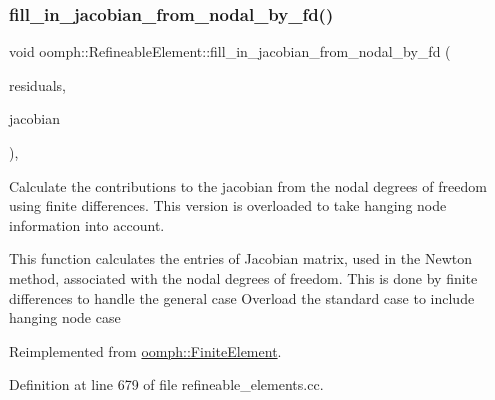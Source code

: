 \mbox{\label{classoomph_1_1RefineableElement_a83ff8606d2ccf11f7c70a95991cd50d5}} 
\subsubsection{\texorpdfstring{fill\+\_\+in\+\_\+jacobian\+\_\+from\+\_\+nodal\+\_\+by\+\_\+fd()}{fill\_in\_jacobian\_from\_nodal\_by\_fd()}}
{\footnotesize\ttfamily void oomph\+::\+Refineable\+Element\+::fill\+\_\+in\+\_\+jacobian\+\_\+from\+\_\+nodal\+\_\+by\+\_\+fd (\begin{DoxyParamCaption}\item[{\hyperlink{classoomph_1_1Vector}{Vector}$<$ double $>$ \&}]{residuals,  }\item[{\hyperlink{classoomph_1_1DenseMatrix}{Dense\+Matrix}$<$ double $>$ \&}]{jacobian }\end{DoxyParamCaption})\hspace{0.3cm}{\ttfamily [protected]}, {\ttfamily [virtual]}}



Calculate the contributions to the jacobian from the nodal degrees of freedom using finite differences. This version is overloaded to take hanging node information into account. 

This function calculates the entries of Jacobian matrix, used in the Newton method, associated with the nodal degrees of freedom. This is done by finite differences to handle the general case Overload the standard case to include hanging node case 

Reimplemented from \hyperlink{classoomph_1_1FiniteElement_a4a79882efb07751842d0b714a0c7f2ec}{oomph\+::\+Finite\+Element}.



Definition at line 679 of file refineable\+\_\+elements.\+cc.



